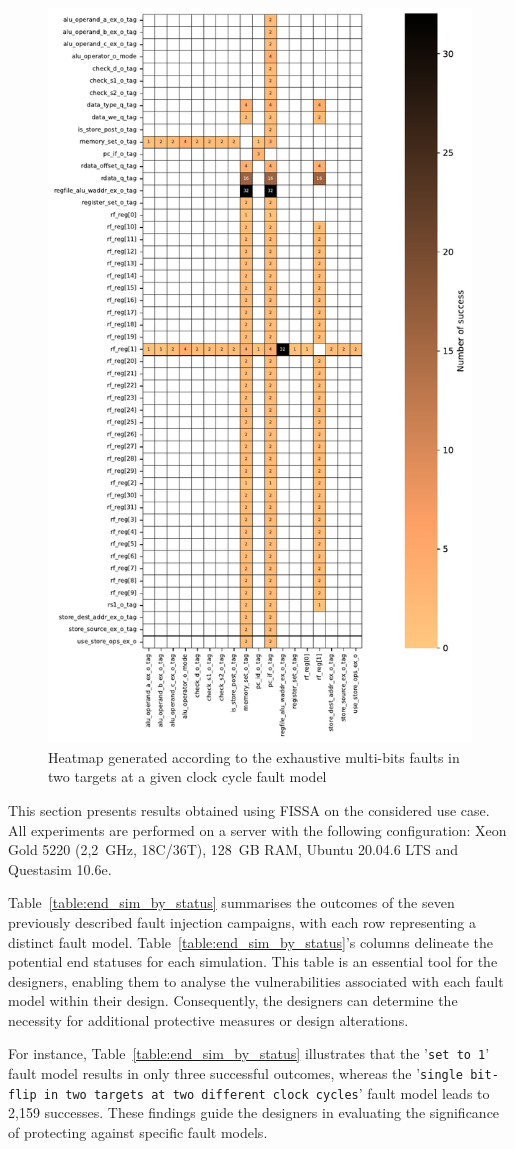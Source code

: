 \begin{figure}[t]
    \centering
    \includegraphics[width=.5\linewidth]{c4_fissa/img/heatmap/heatmap_buffer_overflow_wop_1_multi_bitflip_reg_multi_2.pdf}
    \caption{Heatmap generated according to the exhaustive multi-bits faults in two targets at a given clock cycle fault model}
    \label{fig:heatmap_multi_reg_multi}
\end{figure}


This section presents results obtained using FISSA on the considered use case.
All experiments are performed on a server with the following configuration: Xeon Gold 5220 (2,2~GHz, 18C/36T), 128~GB RAM, Ubuntu 20.04.6 LTS and Questasim 10.6e.

Table~\ref{table:end_sim_by_status} summarises the outcomes of the seven previously described fault injection campaigns, with each row representing a distinct fault model. Table~\ref{table:end_sim_by_status}'s columns delineate the potential end statuses for each simulation. This table is an essential tool for the designers, enabling them to analyse the vulnerabilities associated with each fault model within their design. Consequently, the designers can determine the necessity for additional protective measures or design alterations.

For instance, Table~\ref{table:end_sim_by_status} illustrates that the '\texttt{set to 1}' fault model results in only three successful outcomes, whereas the '\texttt{single bit-flip in two targets at two different clock cycles}' fault model leads to 2,159 successes. These findings guide the designers in evaluating the significance of protecting against specific fault models.


